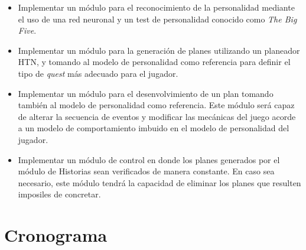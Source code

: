 \begin{itemize}
\item Implementar un módulo para el reconocimiento de la personalidad mediante el uso de una red neuronal y un test de personalidad conocido como \textit{The Big Five}.

\item Implementar un módulo para la generación de planes utilizando un planeador \ac{HTN}, y tomando al modelo de personalidad como referencia para definir el tipo de \textit{quest} más adecuado para el jugador.

\item Implementar un módulo para el desenvolvimiento de un plan tomando también al modelo de personalidad como referencia. Este módulo será capaz de alterar la secuencia de eventos y modificar las mecánicas del juego acorde a un modelo de comportamiento imbuido en el modelo de personalidad del jugador.  

\item Implementar un módulo de control en donde los planes generados por el módulo de Historias sean verificados de manera constante. En caso sea necesario, este módulo tendrá la capacidad de  eliminar los planes que resulten imposiles de concretar. 

  
\end{itemize}


\section{Cronograma}

